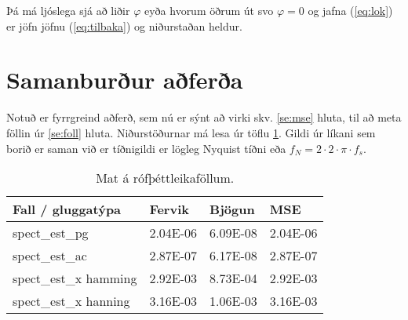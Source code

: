 \documentclass[11pt,a4paper]{article}
\begin{document}
Þá má ljóslega sjá að liðir $\varphi$ eyða hvorum öðrum út svo 
$\varphi=0$ og jafna (\ref{eq:lok}) er jöfn jöfnu (\ref{eq:tilbaka})
og niðurstaðan heldur.
\section{Samanburður aðferða}
Notuð er fyrrgreind aðferð, sem nú er sýnt að virki skv. \ref{se:mse} 
hluta, til að meta föllin úr \ref{se:foll} hluta. Niðurstöðurnar
má lesa úr töflu \ref{tab:tafla}. Gildi úr líkani sem borið er saman
við er tíðnigildi er lögleg Nyquist tíðni eða 
$f_N = 2\cdot2\cdot\pi\cdot f_s$.
\begin{table}[htbp]
    \centering
    \begin{tabular}{l | l | l | l}
        Fall / gluggatýpa & Fervik & Bjögun & MSE \\ \hline
        spect\_est\_pg    & 2.04E-06 & 6.09E-08 & 2.04E-06 \\
        spect\_est\_ac    & 2.87E-07 & 6.17E-08 & 2.87E-07 \\
        spect\_est\_x hamming & 2.92E-03 & 8.73E-04 & 2.92E-03 \\
        spect\_est\_x hanning & 3.16E-03 & 1.06E-03 & 3.16E-03 \\
    \end{tabular}
    \caption{Mat á rófþéttleikaföllum.}
    \label{tab:tafla}
\end{table}
\end{document}
